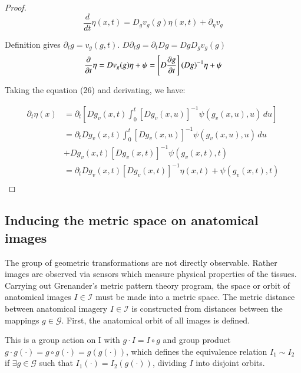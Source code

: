 \documentclass[final, paper=letter,5p,times,twocolumn]{elsarticle}
\theoremstyle{definition}
\begin{document}
{\begin{proof}
  $$
  \frac{d}{dt} \eta(x,t) = D_{g}v_{g}(g) \eta(x,t) + \partial_{\eta} v_{g}
  $$


  Definition gives $\partial_{t} g = v_{g}(g,t)$. $D \partial_{t} g = \partial_{t} Dg = Dg D_{g}v_{g}(g)$
  $$
  \frac{\partial}{\partial t} \eta = D v_{g} (g) \eta + \psi\\
  = \left[ D \frac{\partial g}{\partial t} \right](Dg)^{-1} \eta + \psi
  $$

  Taking the equation (26) and derivating, we have:

  \begin{equation*}
    \begin{split}
    \partial_{t} \eta(x) & = \partial_{t} \left[ D g_{v}(x,t) \int_{0}^{t} \left[ Dg_{v}(x,u) \right]^{-1} \psi(g_{v}(x,u), u) \, du \right]\\
    & = \partial_{t}D g_{v}(x,t) \int_{0}^{t} \left[ Dg_{v}(x,u) \right]^{-1} \psi(g_{v}(x,u), u) \, du  \\
    & + D g_{v}(x,t) \left[ Dg_{v}(x,t) \right]^{-1} \psi(g_{v}(x,t), t) \\
    & = \partial_{t}D g_{v}(x,t) \left[ Dg_{v}(x,t) \right]^{-1} \eta(x,t) + \psi(g_{v}(x,t), t) \\
    \end{split}
  \end{equation*}

   
\end{proof}



\subsection{Inducing the metric space on anatomical images}

The group of geometric transformations are not directly observable. Rather images are observed via sensors which measure physical properties of the tissues. Carrying out Grenander's metric pattern theory program, the space or orbit of anatomical images $I \in \mathcal{I}$ must be made into a metric space. The metric distance between anatomical imagery $I \in \mathcal{I}$ is constructed from distances between the mappings $g \in \mathcal{G}$. First, the anatomical orbit of all images is defined.


This is a group action on I with $g \cdot I = I \circ g$ and group product $g \cdot g(\cdot) = g \circ g(\cdot) = g(g(\cdot))$, which defines the equivalence relation $I_{1} \sim I_{2}$ if $\exists g \in \mathcal{G}$ such that $I_{1}(\cdot) = I_{2}(g(\cdot))$, dividing $I$ into disjoint orbits.



}
\end{document}

